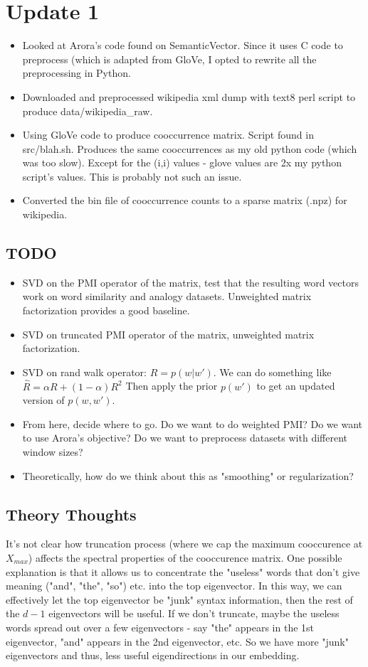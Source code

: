 \documentclass[12pt]{article}
\begin{document}
\section{Update 1}
\begin{itemize}
\item Looked at Arora's code found on SemanticVector. Since it uses C code to preprocess (which is adapted from GloVe, I opted to rewrite all the preprocessing in Python.
\item Downloaded and preprocessed wikipedia xml dump with text8 perl script to produce data/wikipedia\_raw. 
\item Using GloVe code to produce cooccurrence matrix. Script found in src/blah.sh. Produces the same cooccurrences as my old python code (which was too slow). Except for the (i,i) values - glove values are 2x my python script's values. This is probably not such an issue.
\item Converted the bin file of cooccurrence counts to a sparse matrix (.npz) for wikipedia.
\end{itemize}

\subsection{TODO}
\begin{itemize}
\item SVD on the PMI operator of the matrix, test that the resulting word vectors work on word similarity and analogy datasets. Unweighted matrix factorization provides a good baseline.
\item SVD on truncated PMI operator of the matrix, unweighted matrix factorization.
\item SVD on rand walk operator: $R = p(w|w')$. We can do something like $\hat{R} = \alpha R + (1-\alpha) R^2  $ Then apply the prior $p(w')$ to get an updated version of $p(w,w')$.
\item From here, decide where to go. Do we want to do weighted PMI? Do we want to use Arora's objective? Do we want to preprocess datasets with different window sizes?
\item Theoretically, how do we think about this as "smoothing" or regularization?
\end{itemize}

\subsection{Theory Thoughts}
It's not clear how truncation process (where we cap the maximum cooccurence at $X_{max}$) affects the spectral properties of the cooccurence matrix. One possible explanation is that it allows us to concentrate the "useless" words that don't give meaning ("and", "the", "so") etc. into the top eigenvector. In this way, we can effectively let the top eigenvector be "junk" syntax information, then the rest of the $d-1$ eigenvectors will be useful. If we don't truncate, maybe the useless words spread out over a few eigenvectors - say "the" appears in the 1st eigenvector, "and" appears in the 2nd eigenvector, etc. So we have more "junk" eigenvectors and thus, less useful eigendirections in our embedding.
\end{document}
